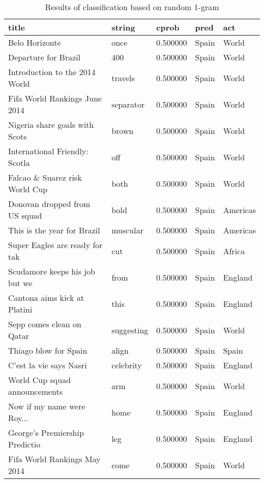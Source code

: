 \begin{table}[h]
\centering
\caption{Results of classification based on random 1-gram}
\begin{tabular}{l|l|l|l|l}
title                           & string       & cprob    & pred    & act      \\ \hline \hline
Belo Horizonte                  & once         & 0.500000 & Spain   & World    \\
Departure for Brazil            & 400          & 0.500000 & Spain   & World    \\
Introduction to the 2014 World  & travels      & 0.500000 & Spain   & World    \\
Fifa World Rankings June 2014   & separator    & 0.500000 & Spain   & World    \\
Nigeria share goals with Scots  & brown        & 0.500000 & Spain   & World    \\
International Friendly: Scotla  & off          & 0.500000 & Spain   & World    \\
Falcao \& Suarez risk World Cup & both         & 0.500000 & Spain   & World    \\
Donovan dropped from US squad   & bold         & 0.500000 & Spain   & Americas \\
This is the year for Brazil     & muscular     & 0.500000 & Spain   & Americas \\
Super Eagles are ready for tak  & cut          & 0.500000 & Spain   & Africa   \\
Scudamore keeps his job but we  & from          & 0.500000 & Spain   & England  \\
Cantona aims kick at Platini    & this         & 0.500000 & Spain   & England  \\
Sepp comes clean on Qatar       & suggesting   & 0.500000 & Spain   & World    \\
Thiago blow for Spain           & align        & 0.500000 & Spain   & Spain    \\
C'est la vie says Nasri         & celebrity    & 0.500000 & Spain   & England  \\
World Cup squad announcements   & arm        & 0.500000 & Spain   & World    \\
Now if my name were Roy...      & home         & 0.500000 & Spain   & England  \\
George's Premiership Predictio  & leg          & 0.500000 & Spain   & England  \\
Fifa World Rankings May 2014    & come         & 0.500000 & Spain   & World    \\

\end{tabular}
\end{table}
